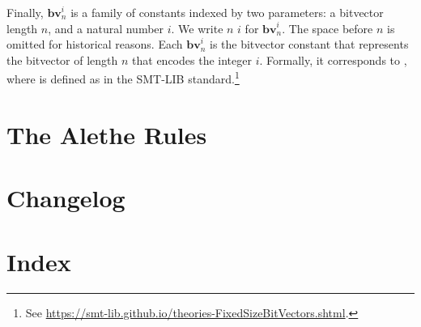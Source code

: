 \documentclass{scrartcl}
\newcommand\lsymb[1]{\mathbf{#1}}
\theoremstyle{definition}
\begin{document}
\noindent
Finally, $\lsymb{bv}_n^i$ is a family of constants indexed by two parameters:
a bitvector length $n$, and a natural number $i$.  We
write $n$ $i$ \inlineAlethe{)} for $\lsymb{bv}_n^i$.
The space before $n$ is omitted for historical reasons.
Each $\lsymb{bv}_n^i$ is the bitvector constant that represents the bitvector
of length $n$ that encodes the integer $i$.  Formally, it corresponds
to , where  is defined
as in the SMT-LIB
standard.\footnote{See \url{https://smt-lib.github.io/theories-FixedSizeBitVectors.shtml}.}

\section{The Alethe Rules}
\label{apx:rules}


\clearpage
\section*{Changelog}
\label{sec:rules}


\clearpage
\section*{Index}
\printindex



\end{document}
